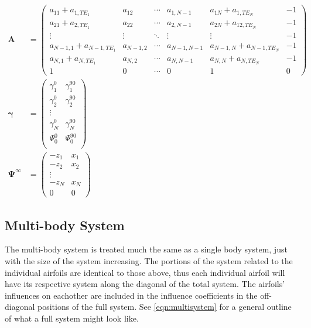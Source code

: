 \documentclass[]{article}
\newcommand{\vect}{\mathbf}
\begin{document}
\begin{align}
	\vect{A} &= \begin{pmatrix}
		a_{11}+a_{1,TE_1} & a_{12} &  \cdots  & a_{1,N-1} & a_{1N}+a_{1,TE_N} & -1 \\
		a_{21}+a_{2,TE_1} & a_{22} & \cdots & a_{2,N-1} & a_{2N}+a_{12,TE_N} & -1 \\
		\vdots & \vdots &  \ddots &  \vdots & \vdots & -1 \\
		a_{N-1,1}+a_{N-1,TE_1} & a_{N-1,2} &  \cdots & a_{N-1,N-1} & a_{N-1,N}+a_{N-1,TE_N} & -1 \\
		a_{N,1}+a_{N,TE_1} & a_{N,2} & \cdots & a_{N,N-1} & a_{N,N}+a_{N,TE_N} & -1 \\
		1 & 0 & \cdots  & 0 & 1 & 0
	\end{pmatrix} \\
%
\vect{\gamma} &= 	\begin{pmatrix}
	\gamma^0_1 & \gamma^{90}_1 \\
	\gamma^0_2 & \gamma^{90}_2 \\
	\vdots \\
	\gamma^0_N & \gamma^{90}_N \\
	\Psi^0_0 & \Psi^{90}_0\\
\end{pmatrix} \\
%
\vect{\Psi}^\infty &= 
\begin{pmatrix}
	-z_1 & x_1 \\
	-z_2 & x_2 \\
	\vdots \\
	-z_N & x_N \\
	0 & 0
\end{pmatrix}
\end{align}


\subsection{Multi-body System}

The multi-body system is treated much the same as a single body system, just with the size of the system increasing.
The portions of the system related to the individual airfoils are identical to those above, thus each individual airfoil will have its respective system along the diagonal of the total system.
The airfoils' influences on eachother are included in the influence coefficients in the off-diagonal positions of the full system.
See \cref{eqn:multisystem} for a general outline of what a full system might look like.
\end{document}
